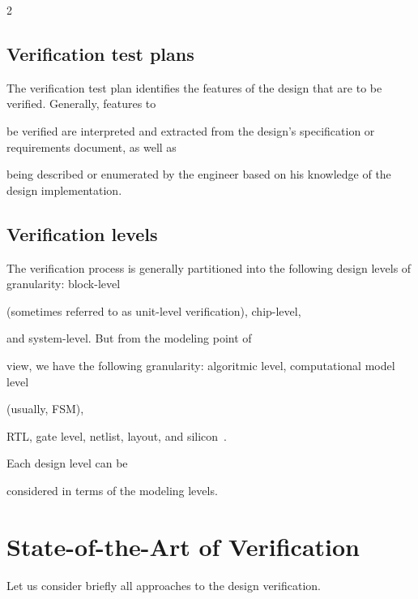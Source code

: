 \begin{multicols}{2}
\subsection{Verification test plans} %





    \noindent


The verification test plan identifies the features of the design that are to be verified. Generally, features to


be verified are interpreted and extracted from the design's specification or requirements document, as well as


being described or enumerated by the engineer based on his knowledge of the design implementation.





\subsection{Verification levels} %





    \noindent


The verification process is generally partitioned into the following design levels of granularity: block-level


(sometimes referred to as unit-level verification), chip-level,


and system-level. But from the modeling point of


view, we have the following granularity: algoritmic level, computational model level


(usually, FSM),


  RTL, gate level, netlist, layout, and silicon~\cite{1bar}.


Each design level can be


considered in terms of the modeling levels.





\section{State-of-the-Art of Verification} %





       \noindent


Let us consider briefly all approaches to the design verification.






\end{multicols}
